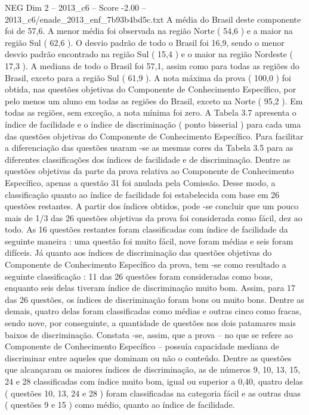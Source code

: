 \begin{textsample}{NEG Dim 2 – 2013\_c6 – Score -2.00 – 2013\_c6/enade\_2013\_enf\_7b93b4bd5c.txt}
A média do Brasil deste componente foi de 57,6.
A menor média foi observada na região Norte ( 54,6 ) e a maior na região Sul ( 62,6 ).
O desvio padrão de todo o Brasil foi 16,9, sendo o menor desvio padrão encontrado na região Sul ( 15,4 ) e o maior na região Nordeste ( 17,3 ).
A mediana de todo o Brasil foi 57,1, assim como para todas as regiões do Brasil, exceto para a região Sul ( 61,9 ).
A nota máxima da prova ( 100,0 ) foi obtida, nas questões objetivas do Componente de Conhecimento Específico, por pelo menos um aluno em todas as regiões do Brasil, exceto na Norte ( 95,2 ).
Em todas as regiões, sem exceção, a nota mínima foi zero.
A Tabela 3.7 apresenta o índice de facilidade e o índice de discriminação ( ponto bisserial ) para cada uma das questões objetivas do Componente de Conhecimento Específico.
Para facilitar a diferenciação das questões usaram -se as mesmas cores da Tabela 3.5 para as diferentes classificações dos índices de facilidade e de discriminação.
Dentre as questões objetivas da parte da prova relativa ao Componente de Conhecimento Específico, apenas a questão 31 foi anulada pela Comissão.
Desse modo, a classificação quanto ao índice de facilidade foi estabelecida com base em 26 questões restantes.
A partir dos índices obtidos, pode -se concluir que um pouco mais de 1/3 das 26 questões objetivas da prova foi considerada como fácil, dez ao todo.
As 16 questões restantes foram classificadas com índice de facilidade da seguinte maneira : uma questão foi muito fácil, nove foram médias e seis foram difíceis.
Já quanto aos índices de discriminação das questões objetivas do Componente de Conhecimento Específico da prova, tem -se como resultado a seguinte classificação : 11 das 26 questões foram consideradas como boas, enquanto seis delas tiveram índice de discriminação muito bom.
Assim, para 17 das 26 questões, os índices de discriminação foram bons ou muito bons.
Dentre as demais, quatro delas foram classificadas como médias e outras cinco como fracas, sendo nove, por conseguinte, a quantidade de questões nos dois patamares mais baixos de discriminação.
Constata -se, assim, que a prova – no que se refere ao Componente de Conhecimento Específico – possuía capacidade mediana de discriminar entre aqueles que dominam ou não o conteúdo.
Dentre as questões que alcançaram os maiores índices de discriminação, as de números 9, 10, 13, 15, 24 e 28 classificadas com índice muito bom, igual ou superior a 0,40, quatro delas ( questões 10, 13, 24 e 28 ) foram classificadas na categoria fácil e as outras duas ( questões 9 e 15 ) como médio, quanto ao índice de facilidade.

\end{textsample}
